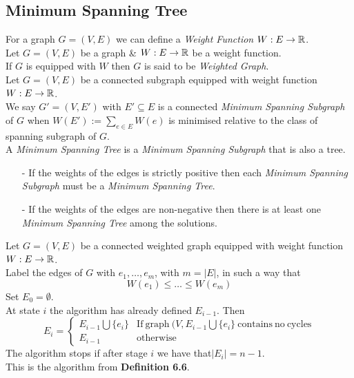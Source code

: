 \documentclass[11pt,a4paper]{article}
\begin{document}
\subsection{Minimum Spanning Tree}

For a graph $G=(V,E)$ we can define a \textit{Weight Function} $W:E\to\mathbb{R}$.\\

Let $G=(V,E)$ be a graph \& $W:E\to\mathbb{R}$ be a weight function.\\
If $G$ is equipped with $W$ then $G$ is said to be \textit{Weighted Graph}.\\

Let $G=(V,E)$ be a connected subgraph equipped with weight function $W:E\to\mathbb{R}$.\\
We say $G'=(V,E')$ with $E'\subseteq E$ is a connected \textit{Minimum Spanning Subgraph} of $G$ when $W(E'):=\sum_{e\in E}W(e)$ is minimised relative to the class of spanning subgraph of $G$.\\

A \textit{Minimum Spanning Tree} is a \textit{Minimum Spanning Subgraph} that is also a tree.\\

\begin{itemize}
	\item[-] If the weights of the edges is strictly positive then each \textit{Minimum Spanning Subgraph} must be a \textit{Minimum Spanning Tree}.
	\item[-] If the weights of the edges are non-negative then there is at least one \textit{Minimum Spanning Tree} among the solutions.
\end{itemize}

Let $G=(V,E)$ be a connected weighted graph equipped with weight function $W:E\to\mathbb{R}$.\\
Label the edges of $G$ with $e_1,\dots,e_m$, with $m=|E|$, in such a way that
$$W(e_1)\leq\dots\leq W(e_m)$$
Set $E_0=\emptyset$.\\
At state $i$ the algorithm has already defined $E_{i-1}$. Then
$$E_i=\begin{cases}E_{i-1}\bigcup\{e_i\}&\mathrm{If\ graph\ }(V,E_{i-1}\bigcup\{e_i\}\ \mathrm{contains\ no\ cycles}\\E_{i-1}&\mathrm{otherwise}\end{cases}$$
The algorithm stops if after stage $i$ we have that$|E_i|=n-1$.\\
\nb This is the algorithm from \textbf{Definition 6.6}.\\
\end{document}
